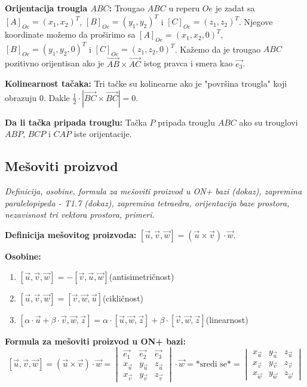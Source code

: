 \documentclass[12pt]{article}
\newcommand{\vek}[1]{\overrightarrow{#1}}
\begin{document}
\textbf{Orijentacija trougla $ABC$:} Trougao $ABC$ u reperu $Oe$ je zadat sa
$[A]_{Oe}=(x_1,x_2)^T$, $[B]_{Oe}=(y_1,y_2)^T$ i $[C]_{Oe}=(z_1,z_2)^T$.
Njegove koordinate možemo da proširimo sa
$[A]_{Oe}=(x_1,x_2,0)^T$, $[B]_{Oe}=(y_1,y_2,0)^T$ i $[C]_{Oe}=(z_1,z_2,0)^T$.
Kažemo da je trougao $ABC$ pozitivno orijentisan ako je
$\vek{AB}\times\vek{AC}$ istog pravca i smera kao $\vek{e_3}$.
\par

\textbf{Kolinearnost tačaka:} Tri tačke su kolinearne ako je "površina trougla"
koji obrazuju $0$. Dakle $\frac{1}{2}\cdot |\vek{BC}\times\vek{BC}|=0$.
\par

\textbf{Da li tačka pripada trouglu:} Tačka $P$ pripada trouglu $ABC$ ako su
trouglovi $ABP$, $BCP$ i $CAP$ iste orijentacije.

\subsection{Mešoviti proizvod}
\textit{Definicija, osobine, formula za mešoviti proizvod u ON+ bazi (dokaz),
    zapremina paralelopipeda - T1.7 (dokaz), zapremina tetraedra, orijentacija baze
    prostora, nezavisnost tri vektora prostora, primeri.}
\par
\vspace*{1cm}

\textbf{Definicija mešovitog proizvoda:} $[\vek{u},\vek{v},\vek{w}]=
    (\vek{u}\times\vek{v})\cdot\vek{w}$.
\par

\textbf{Osobine:}
\begin{enumerate}[label=\textbf{(\arabic*)}]
    \item $[\vek{u},\vek{v},\vek{w}]=-[\vek{v},\vek{u},\vek{w}]$\hspace*{1cm}(antisimetričnost)
    \item $[\vek{u},\vek{v},\vek{w}]=[\vek{v},\vek{w},\vek{u}]$\hspace*{1cm}(cikličnost)
    \item $[\alpha\cdot\vek{u}+\beta\cdot\vek{v},\vek{w},\vek{z}]=\alpha\cdot[\vek{u},\vek{w},\vek{z}]+\beta\cdot[\vek{v},\vek{w},\vek{z}]$\hspace*{1cm}(linearnost)
\end{enumerate}
\par

\textbf{Formula za mešoviti proizvod u ON+ bazi:}
$$[\vek{u},\vek{v},\vek{w}]=(\vek{u}\times\vek{v})\cdot\vek{w}= \begin{vmatrix}
        \vek{e_1}   & \vek{e_2}   & \vek{e_3}   \\
        x_{\vek{u}} & y_{\vek{u}} & z_{\vek{u}} \\
        x_{\vek{v}} & y_{\vek{v}} & z_{\vek{v}}
    \end{vmatrix}\cdot\vek{w}=\text{*sredi se*}= \begin{vmatrix}
        x_{\vek{u}} & y_{\vek{u}} & z_{\vek{u}} \\
        x_{\vek{v}} & y_{\vek{v}} & z_{\vek{v}} \\
        x_{\vek{w}} & y_{\vek{w}} & z_{\vek{w}}
    \end{vmatrix}$$
\par
\end{document}
